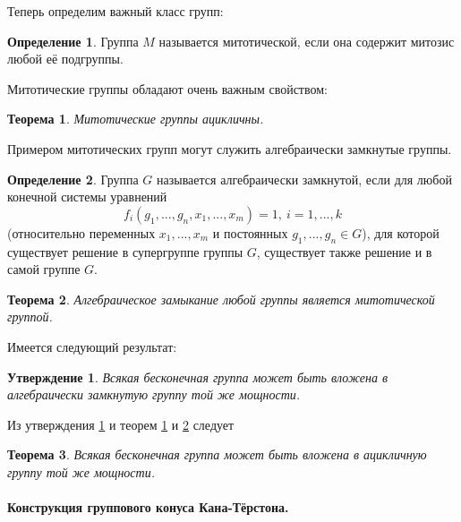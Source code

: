 \documentclass[14pt, dvipsnames]{extarticle}
\newtheorem{theorem}{Теорема}
\newtheorem{statement}{Утверждение}
\theoremstyle{definition}
\newtheorem{defi}{Определение}
\theoremstyle{remark}
\newcommand{\factor}[2]{{\raisebox{.2em}{$#1$}\left/\raisebox{-.2em}{$#2$}\right.}}
\begin{document}
Теперь определим важный класс групп:

\begin{defi}
Группа $M$ называется митотической, если она содержит митозис  любой её подгруппы.
\end{defi}

Митотические группы обладают очень важным свойством:

\begin{theorem}\label{mitac_0}
Митотические группы ацикличны. 
\end{theorem}

Примером митотических групп могут служить алгебраически замкнутые группы.

\begin{defi}
Группа $G$ называется алгебраически замкнутой, если для любой конечной системы уравнений 
$$f_i(g_1, ..., g_n, x_1, ..., x_m)=1,\ i=1, ..., k$$ (относительно переменных $x_1, ..., x_m$ и постоянных $g_1, ..., g_n\in G$), для которой существует решение в супергруппе группы $G$, существует также решение и в самой группе $G$. 
\end{defi}

\begin{theorem}\label{mitac}
Алгебраическое замыкание любой группы является митотической группой.
\end{theorem}

Имеется следующий результат:

\begin{statement}\label{closure}
Всякая бесконечная группа может быть вложена в алгебраически замкнутую группу той же мощности.
\end{statement}

Из утверждения \ref{closure} и теорем \ref{mitac_0} и \ref{mitac} следует

\begin{theorem}
Всякая бесконечная группа может быть вложена в ацикличную группу той же мощности.
\end{theorem} 















\paragraph{Конструкция группового конуса Кана-Тёрстона.}
\end{document}
